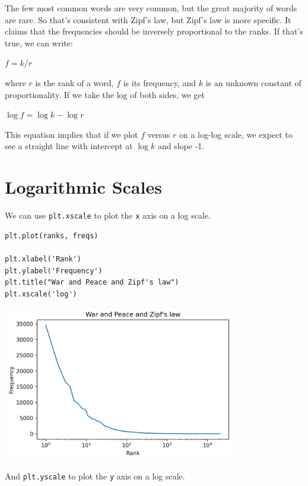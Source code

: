 The few most common words are very common, but the great majority of
words are rare. So that's consistent with Zipf's law, but Zipf's law is
more specific. It claims that the frequencies should be inversely
proportional to the ranks. If that's true, we can write:

\(f = k / r\)

where \(r\) is the rank of a word, \(f\) is its frequency, and \(k\) is
an unknown constant of proportionality. If we take the log of both
sides, we get

\(\log f = \log k - \log r\)

This equation implies that if we plot \(f\) versus \(r\) on a log-log
scale, we expect to see a straight line with intercept at \(\log k\) and
slope -1.

\hypertarget{logarithmic-scales}{%
\section{Logarithmic Scales}\label{logarithmic-scales}}

We can use \passthrough{\lstinline!plt.xscale!} to plot the
\passthrough{\lstinline!x!} axis on a log scale.

\begin{lstlisting}[]
plt.plot(ranks, freqs)

plt.xlabel('Rank')
plt.ylabel('Frequency')
plt.title("War and Peace and Zipf's law")
plt.xscale('log')
\end{lstlisting}

\begin{center}
\includegraphics[width=4in]{chapters/06_plotting_files/06_plotting_76_0.png}
\end{center}

And \passthrough{\lstinline!plt.yscale!} to plot the
\passthrough{\lstinline!y!} axis on a log scale.

